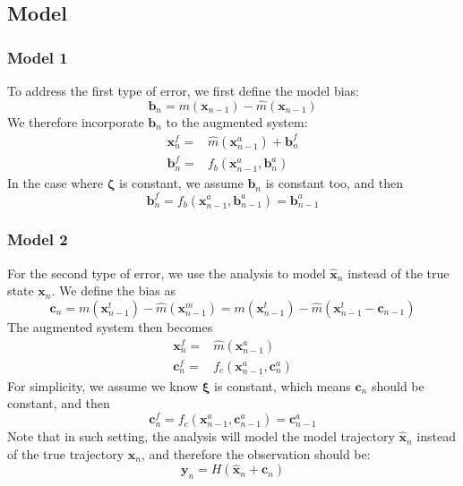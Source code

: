 \documentclass{report}
\begin{document}
\subsection*{Model}
\subsubsection*{Model 1}
To address the first type of error, we first define the model bias:
\begin{equation}
\pmb{b}_{n}=m(\pmb{x}_{n-1})-\hat{m}(\pmb{x}_{n-1})
\end{equation}
We therefore incorporate $\pmb{b}_n$ to the augmented system:
\begin{align}
\pmb{x}_{n}^{f}=&\hat{m}(\pmb{x}_{n-1}^{a})+\pmb{b}_{n}^{f}\\
\pmb{b}_{n}^{f}=&f_{b}(\pmb{x}_{n-1}^{a},\pmb{b}_{n}^{a})
\end{align}
In the case where $\pmb{\zeta}$ is constant, we assume $\pmb{b}_n$ is constant too, and then
\begin{equation}
\pmb{b}_{n}^{f}=f_{b}(\pmb{x}_{n-1}^{a},\pmb{b}_{n-1}^{a})=\pmb{b}_{n-1}^{a}
\end{equation}
\subsubsection*{Model 2}
For the second type of error, we use the analysis to model $\hat{\pmb{x}}_n$ instead of the true state $\pmb{x}_n$. We define the bias as
\begin{equation}
\pmb{c}_{n}=m(\pmb{x}_{n-1}^{t})-\hat{m}(\pmb{x}_{n-1}^{m})=m(\pmb{x}_{n-1}^{t})-\hat{m}(\pmb{x}_{n-1}^{t}-\pmb{c}_{n-1})
\end{equation}
The augmented system then becomes
\begin{align}
\pmb{x}_{n}^{f}=&\hat{m}(\pmb{x}_{n-1}^{a})\\
\pmb{c}_{n}^{f}=&f_{c}(\pmb{x}_{n-1}^{a},\pmb{c}_{n}^{a})
\end{align}
For simplicity, we assume we know $\pmb{\xi}$ is constant, which means $\pmb{c}_n$ should be constant, and then
\begin{equation}
\pmb{c}_{n}^{f}=f_{c}(\pmb{x}_{n-1}^{a},\pmb{c}_{n-1}^{a})=\pmb{c}_{n-1}^{a}
\end{equation} 
Note that in such setting, the analysis will model the model trajectory $\hat{\pmb{x}}_{n}$ instead of the true trajectory $\pmb{x}_n$, and therefore the observation should be:
\begin{equation}
\pmb{y}_n=H(\hat{\pmb{x}}_n+\pmb{c}_n)
\end{equation}
\end{document}
